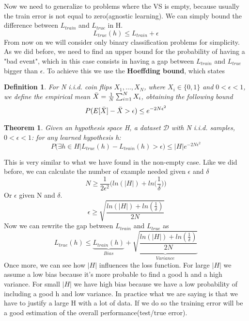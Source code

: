 \documentclass[main.tex]{subfiles}
\newtheorem{theorem}{Theorem}[section] %
\newtheorem{definition}{Definition}[section]
\begin{document}
Now we need to generalize to problems where the VS is empty, because usually the train error is not equal to zero(agnostic learning). We can simply bound the difference between $L_{train}$ and $L_{true}$ in H.
\begin{equation*}
    L_{true}(h) \leq L_{train} + \epsilon
\end{equation*}
From now on we will consider only binary classification problems for simplicity. As we did before, we need to find an upper bound for the probability of having a "bad event", which in this case consists in having a gap between $L_{train}$ and $L_{true}$ bigger than $\epsilon$. To achieve this we use the \textbf{Hoeffding bound}, which states
\begin{definition}
    For N i.i.d. coin flips $X_1, \dots, X_N$, where $X_i \in \{0,1\}$ and $0 < \epsilon < 1$, we define the empirical mean $\Bar{X}=\frac{1}{N}\sum_{i=1}^N X_i$, obtaining the following bound
    \begin{equation*}
        P(E[\Bar{X}]-\Bar{X} > \epsilon) \leq e^{-2N\epsilon^2}
    \end{equation*}
\end{definition}
\begin{theorem}
    Given an hypothesis space H, a dataset $\mathcal{D}$ with N i.i.d. samples, $0< \epsilon <1$: for any learned hypothesis h:
    \begin{equation*}
        P(\exists h \in H | L_{true}(h)-L_{train}(h) > \epsilon) \leq |H|e^{-2N \epsilon^2}
    \end{equation*}
\end{theorem}
This is very similar to what we have found in the non-empty case. Like we did before, we can calculate the number of example needed given $\epsilon$ and $\delta$
\begin{equation*}
    N \geq \frac{1}{2 \epsilon^2} \bigg( ln(|H|) + ln\bigg( \frac{1}{\delta} \bigg) \bigg)
\end{equation*}
Or $\epsilon$ given N and $\delta$.
\begin{equation*}
    \epsilon \geq \sqrt{\frac{ln(|H|) + ln( \frac{1}{\delta} )}{2N}}
\end{equation*}
Now we can rewrite the gap between $L_{train}$ and $L_{true}$ as
\begin{equation}
    L_{true}(h) \leq \underbrace{L_{train}(h)}_{Bias} + \underbrace{\sqrt{\frac{ln(|H|) + ln( \frac{1}{\delta} )}{2N}}}_{Variance}
\end{equation}
Once more, we can see how $|H|$ influences the loss function. For large $|H|$ we assume a low bias because it's more probable to find a good h and a high variance. For small $|H|$ we have high bias because we have a low probability of including a good h and low variance. In practice what we are saying is that we have to justify a large H with a lot of data. If we do so the training error will be a good estimation of the overall performance(test/true error).
\end{document}
